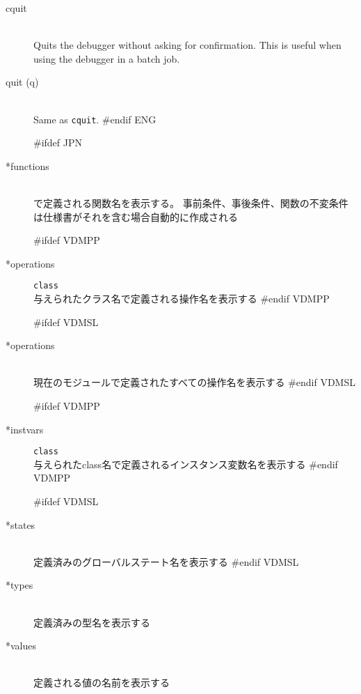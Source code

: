 \documentclass[\pformat,12pt]{article}
\newcommand{\Toolbox}{Toolbox}
\newcommand{\Toolbox}{Toolbox}
\begin{document}
\begin{description}
\item[cquit]  \mbox{}\\
  Quits the debugger without asking for confirmation.  This is useful
  when using the debugger in a batch job.

\item[quit (q)] \mbox{}\\
  Same as {\tt cquit}.
#endif ENG

#ifdef JPN
\item[*functions]  \mbox{}\\ 
  で定義される関数名を表示する。
  事前条件、事後条件、関数の不変条件は仕様書がそれを含む場合自動的に作成される

#ifdef VDMPP
\item[*operations] {\tt class}\mbox{}\\
  与えられたクラス名で定義される操作名を表示する
#endif VDMPP

#ifdef VDMSL
\item[*operations] \mbox{}\\
  現在のモジュールで定義されたすべての操作名を表示する
#endif VDMSL

#ifdef VDMPP
\item[*instvars] {\tt class}\mbox{}\\
  与えられたclass名で定義されるインスタンス変数名を表示する
#endif VDMPP

#ifdef VDMSL
\item[*states]\mbox{}\\
  定義済みのグローバルステート名を表示する
#endif VDMSL

\item[*types] \mbox{}\\ 
  定義済みの型名を表示する

\item[*values] \mbox{}\\ 
  定義される値の名前を表示する


\end{description}
\end{document}

